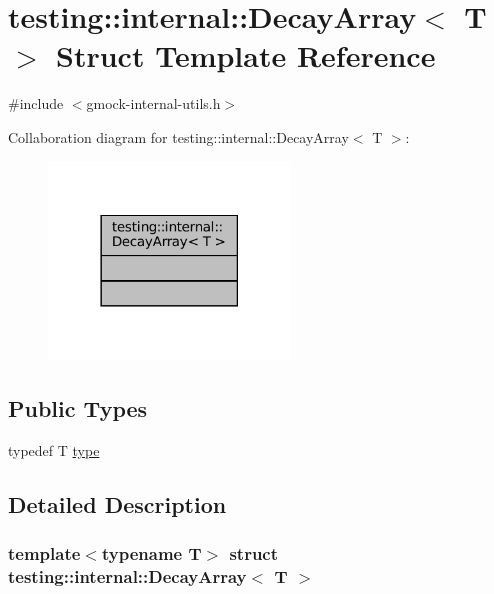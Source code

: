\hypertarget{structtesting_1_1internal_1_1DecayArray}{}\section{testing\+:\+:internal\+:\+:Decay\+Array$<$ T $>$ Struct Template Reference}
\label{structtesting_1_1internal_1_1DecayArray}


{\ttfamily \#include $<$gmock-\/internal-\/utils.\+h$>$}



Collaboration diagram for testing\+:\+:internal\+:\+:Decay\+Array$<$ T $>$\+:
\nopagebreak
\begin{figure}[H]
\begin{center}
\leavevmode
\includegraphics[width=182pt]{structtesting_1_1internal_1_1DecayArray__coll__graph}
\end{center}
\end{figure}
\subsection*{Public Types}
\begin{DoxyCompactItemize}
\item 
typedef T \hyperlink{structtesting_1_1internal_1_1DecayArray_a39803f9bafd56bc4531f86eb34fe9c0f}{type}
\end{DoxyCompactItemize}


\subsection{Detailed Description}
\subsubsection*{template$<$typename T$>$\newline
struct testing\+::internal\+::\+Decay\+Array$<$ T $>$}



